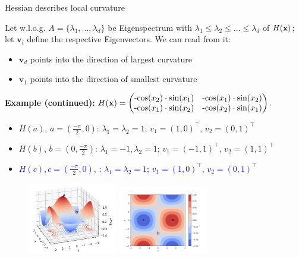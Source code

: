 \begin{vbframe}{Hessian describes local curvature} 

Let w.l.o.g. $A = \{\lambda_1, ..., \lambda_d\}$ be Eigenspectrum with $\lambda_1 \le \lambda_2 \le ... \le \lambda_d$ of $H(\mathbf{x})$; let $\bm{v}_i$ define the respective Eigenvectors. We can read from it: 

\begin{itemize}
  \item $\bm{v}_d$ points into the direction of largest curvature 
  \item $\bm{v}_1$ points into the direction of smallest curvature 
\end{itemize}

\vspace*{0.2cm}

\begin{footnotesize}

\textbf{Example (continued):} $H(\mathbf{x}) = \begin{pmatrix}
\text{-cos}(x_2)\cdot\text{sin}(x_1) & \text{-cos}(x_1)\cdot\text{sin}(x_2) 
\\ \text{-cos}(x_1)\cdot\text{sin}(x_2) & \text{-cos}(x_2)\cdot\text{sin}(x_1) 
\end{pmatrix}.
$

\begin{itemize}
  \item $H(a)$, $a=(\frac{-\pi}{2},0)$: $\lambda_1 = \lambda_2 = 1$; $v_1 = (1, 0)^\top$, $v_2 = (0, 1)^\top$
  \item $H(b)$, $b=(0,\frac{-\pi}{2})$: $\lambda_1 = -1, \lambda_2 = 1$; $v_1 = (-1, 1)^\top$, $v_2 = (1, 1)^\top$
  \item \textcolor{blue}{$H(c), c=(\frac{-\pi}{2},0)$, : $\lambda_1 = \lambda_2 = 1$; $v_1 = (1, 0)^\top$, $v_2 = (0, 1)^\top$}
\end{itemize}

\end{footnotesize}

\vspace*{-0.5cm}

\begin{figure}[!tbp]
    \includegraphics[width=0.35\textwidth]{figure_man/hessian_3d.png}
    \includegraphics[width=0.35\textwidth]{figure_man/hessian_contour.png}
\end{figure} 

\end{vbframe}


